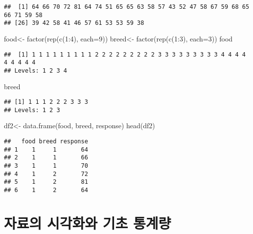 \documentclass[
]{book}
\newenvironment{Shaded}{\begin{snugshade}}{\end{snugshade}}
\newcommand{\AttributeTok}[1]{\textcolor[rgb]{0.77,0.63,0.00}{#1}}
\newcommand{\DecValTok}[1]{\textcolor[rgb]{0.00,0.00,0.81}{#1}}
\newcommand{\FunctionTok}[1]{\textcolor[rgb]{0.00,0.00,0.00}{#1}}
\newcommand{\NormalTok}[1]{#1}
\newcommand{\OtherTok}[1]{\textcolor[rgb]{0.56,0.35,0.01}{#1}}
\newcommand{\SpecialCharTok}[1]{\textcolor[rgb]{0.00,0.00,0.00}{#1}}
\begin{document}
\begin{verbatim}
##  [1] 64 66 70 72 81 64 74 51 65 65 63 58 57 43 52 47 58 67 59 68 65 66 71 59 58
## [26] 39 42 58 41 46 57 61 53 53 59 38
\end{verbatim}

\begin{Shaded}
\begin{Highlighting}[]
\NormalTok{food}\OtherTok{\textless{}{-}} \FunctionTok{factor}\NormalTok{(}\FunctionTok{rep}\NormalTok{(}\FunctionTok{c}\NormalTok{(}\DecValTok{1}\SpecialCharTok{:}\DecValTok{4}\NormalTok{), }\AttributeTok{each=}\DecValTok{9}\NormalTok{)) }
\NormalTok{breed}\OtherTok{\textless{}{-}} \FunctionTok{factor}\NormalTok{(}\FunctionTok{rep}\NormalTok{(}\FunctionTok{c}\NormalTok{(}\DecValTok{1}\SpecialCharTok{:}\DecValTok{3}\NormalTok{), }\AttributeTok{each=}\DecValTok{3}\NormalTok{))}
\NormalTok{food}
\end{Highlighting}
\end{Shaded}

\begin{verbatim}
##  [1] 1 1 1 1 1 1 1 1 1 2 2 2 2 2 2 2 2 2 3 3 3 3 3 3 3 3 3 4 4 4 4 4 4 4 4 4
## Levels: 1 2 3 4
\end{verbatim}

\begin{Shaded}
\begin{Highlighting}[]
\NormalTok{breed}
\end{Highlighting}
\end{Shaded}

\begin{verbatim}
## [1] 1 1 1 2 2 2 3 3 3
## Levels: 1 2 3
\end{verbatim}

\begin{Shaded}
\begin{Highlighting}[]
\NormalTok{df2}\OtherTok{\textless{}{-}} \FunctionTok{data.frame}\NormalTok{(food, breed, response)}
\FunctionTok{head}\NormalTok{(df2)}
\end{Highlighting}
\end{Shaded}

\begin{verbatim}
##   food breed response
## 1    1     1       64
## 2    1     1       66
## 3    1     1       70
## 4    1     2       72
## 5    1     2       81
## 6    1     2       64
\end{verbatim}

\hypertarget{uxc790uxb8ccuxc758-uxc2dcuxac01uxd654uxc640-uxae30uxcd08-uxd1b5uxacc4uxb7c9-1}{%
\section{자료의 시각화와 기초 통계량}\label{uxc790uxb8ccuxc758-uxc2dcuxac01uxd654uxc640-uxae30uxcd08-uxd1b5uxacc4uxb7c9-1}}
\end{document}
